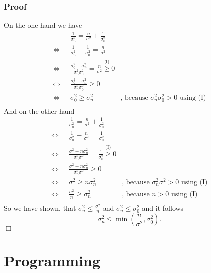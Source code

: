 \documentclass{article}
\begin{document}
\subsubsection*{Proof}
On the one hand we have
\begin{align*}
				   &\frac{1}{\sigma^2_n} = \frac{n}{\sigma^2} + \frac{1}{\sigma^2_0}&\\
\Leftrightarrow ~~~&\frac{1}{\sigma^2_n} - \frac{1}{\sigma^2_0} = \frac{n}{\sigma^2}&\\
\Leftrightarrow ~~~&\frac{\sigma^2_0 - \sigma^2_n}{\sigma^2_n\sigma^2_0} = \frac{n}{\sigma^2} \stackrel{\text{(I)}}{\geq} 0&\\
\Leftrightarrow ~~~&\frac{\sigma^2_0 - \sigma^2_n}{\sigma^2_n\sigma^2_0} \geq 0&\\
\Leftrightarrow ~~~&\sigma^2_0 \geq \sigma^2_n& \text{, because } \sigma^2_n\sigma^2_0 > 0 \text{ using (I)}\\
\end{align*}
And on the other hand
\begin{align*}
				   &\frac{1}{\sigma^2_n} = \frac{n}{\sigma^2} + \frac{1}{\sigma^2_0}&\\
\Leftrightarrow ~~~&\frac{1}{\sigma^2_n} - \frac{n}{\sigma^2} = \frac{1}{\sigma^2_0}&\\
\Leftrightarrow ~~~&\frac{\sigma^2 - n\sigma^2_n}{\sigma^2_n\sigma^2} = \frac{1}{\sigma^2_0} \stackrel{\text{(I)}}{\geq} 0&\\
\Leftrightarrow ~~~&\frac{\sigma^2 - n\sigma^2_n}{\sigma^2_n\sigma^2} \geq 0&\\
\Leftrightarrow ~~~&\sigma^2 \geq n\sigma^2_n& \text{, because } \sigma^2_n\sigma^2 > 0 \text{ using (I)}\\
\Leftrightarrow ~~~&\frac{\sigma^2}{n} \geq \sigma^2_n& \text{, because } n > 0 \text{ using (I)}~~~~~\\
\end{align*}
So we have shown, that $\sigma^2_n \leq \frac{\sigma^2}{n}$ and $\sigma^2_n \leq \sigma^2_0$ and it follows
$$
\sigma^2_n \leq \min \left (\frac{n}{\sigma^2},\sigma^2_0 \right ).
$$
\hspace*{\fill}$\Box$
\section{Programming}


%

%

\end{document}
